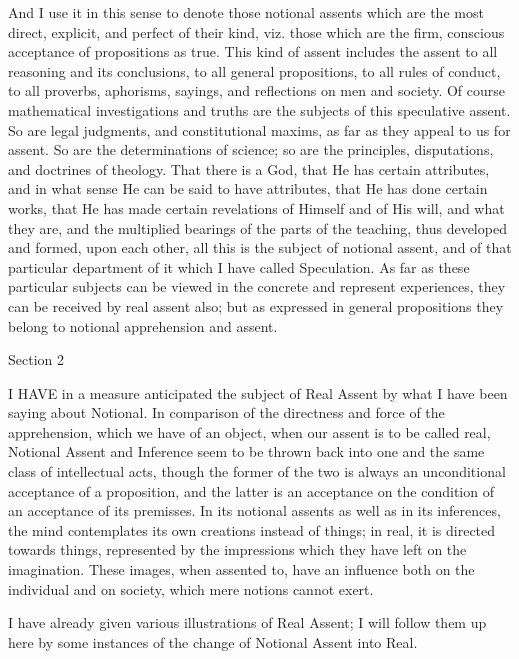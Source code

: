 And I use it in this sense to denote those notional assents which
are the most direct, explicit, and perfect of their kind, viz. those
which are the firm, conscious acceptance of propositions as true. This
kind of assent includes the assent to all reasoning and its
conclusions, to all general propositions, to all rules of conduct, to
all proverbs, aphorisms, sayings, and reflections on men and society.
Of course mathematical investigations and truths are the subjects of
this speculative assent. So are legal judgments, and constitutional
maxims, as far as they appeal to us for assent. So are the
determinations of science; so are the principles, disputations, and
doctrines of theology. That there is a God, that He has certain
attributes, and in what sense He can be said to have attributes, that
He has done certain works, that He has made certain revelations of
Himself and of His will, and what they are, and the multiplied
bearings of the parts of the teaching, thus developed and formed, upon
each other, all this is the subject of notional assent, and of that particular department of it which I have called Speculation. As
far as these particular subjects can be viewed in the concrete and
represent experiences, they can be received by real assent also; but
as expressed in general propositions they belong to notional
apprehension and assent.

Section 2


I HAVE in a measure anticipated the subject of Real Assent by
what I have been saying about Notional. In comparison of the
directness and force of the apprehension, which we have of an object,
when our assent is to be called real, Notional Assent and Inference
seem to be thrown back into one and the same class of intellectual
acts, though the former of the two is always an unconditional
acceptance of a proposition, and the latter is an acceptance on the
condition of an acceptance of its premisses. In its notional assents
as well as in its inferences, the mind contemplates its own creations
instead of things; in real, it is directed towards things, represented
by the impressions which they have left on the imagination. These
images, when assented to, have an influence both on the individual and
on society, which mere notions cannot exert.

I have already given various illustrations of Real Assent; I will
follow them up here by some instances of the change of Notional Assent
into Real.

